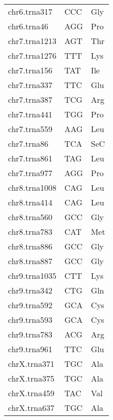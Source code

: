 \begin{longtable}{@{}l>{\collectcell\anticodon}l<{\endcollectcell}l@{}}
    chr6.trna317 & CCC & Gly \\
    chr6.trna46 & AGG & Pro \\
    chr7.trna1213 & AGT & Thr \\
    chr7.trna1276 & TTT & Lys \\
    chr7.trna156 & TAT & Ile \\
    chr7.trna337 & TTC & Glu \\
    chr7.trna387 & TCG & Arg \\
    chr7.trna441 & TGG & Pro \\
    chr7.trna559 & AAG & Leu \\
    chr7.trna86 & TCA & SeC \\
    chr7.trna861 & TAG & Leu \\
    chr7.trna977 & AGG & Pro \\
    chr8.trna1008 & CAG & Leu \\
    chr8.trna414 & CAG & Leu \\
    chr8.trna560 & GCC & Gly \\
    chr8.trna783 & CAT & Met \\
    chr8.trna886 & GCC & Gly \\
    chr8.trna887 & GCC & Gly \\
    chr9.trna1035 & CTT & Lys \\
    chr9.trna342 & CTG & Gln \\
    chr9.trna592 & GCA & Cys \\
    chr9.trna593 & GCA & Cys \\
    chr9.trna783 & ACG & Arg \\
    chr9.trna961 & TTC & Glu \\
    chrX.trna371 & TGC & Ala \\
    chrX.trna375 & TGC & Ala \\
    chrX.trna459 & TAC & Val \\
    chrX.trna637 & TGC & Ala \\
    \bottomrule
\end{longtable}
